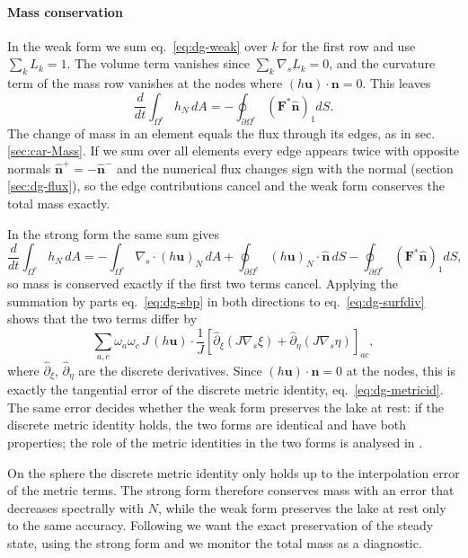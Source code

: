 \paragraph{Mass conservation}
In the weak form we sum eq.~\eqref{eq:dg-weak} over $k$ for the first row and use $\sum_k L_k = 1$. The volume term vanishes since $\sum_k\nabla_s L_k = 0$, and the curvature term of the mass row vanishes at the nodes where $(h\mathbf{u})\cdot\mathbf{n} = 0$. This leaves
\begin{equation*}
    \frac{d}{dt}\int_{\Omega^e}h_N\,dA = -\oint_{\partial\Omega^e}\left(\mathbf{F}^*\hat{\mathbf{n}}\right)_1 dS .
\end{equation*}
The change of mass in an element equals the flux through its edges, as in sec. \ref{sec:car-Mass}. If we sum over all elements every edge appears twice with opposite normals $\hat{\mathbf{n}}^+ = -\hat{\mathbf{n}}^-$ and the numerical flux changes sign with the normal (section \ref{sec:dg-flux}), so the edge contributions cancel and the weak form conserves the total mass exactly.

In the strong form the same sum gives
\begin{equation*}
    \frac{d}{dt}\int_{\Omega^e}h_N\,dA = -\int_{\Omega^e}\nabla_s\cdot(h\mathbf{u})_N\,dA + \oint_{\partial\Omega^e}(h\mathbf{u})_N\cdot\hat{\mathbf{n}}\,dS - \oint_{\partial\Omega^e}\left(\mathbf{F}^*\hat{\mathbf{n}}\right)_1 dS,
\end{equation*}
so mass is conserved exactly if the first two terms cancel. Applying the summation by parts eq.~\eqref{eq:dg-sbp} in both directions to eq.~\eqref{eq:dg-surfdiv} shows that the two terms differ by
\begin{equation*}
    \sum_{a,c}\omega_a\omega_c\,J\,(h\mathbf{u})\cdot\frac{1}{J}\left[\hat\partial_\xi\left(J\nabla_s\xi\right) + \hat\partial_\eta\left(J\nabla_s\eta\right)\right]_{ac},
\end{equation*}
where $\hat\partial_\xi$, $\hat\partial_\eta$ are the discrete derivatives. Since $(h\mathbf{u})\cdot\mathbf{n} = 0$ at the nodes, this is exactly the tangential error of the discrete metric identity, eq.~\eqref{eq:dg-metricid}. The same error decides whether the weak form preserves the lake at rest: if the discrete metric identity holds, the two forms are identical and have both properties; the role of the metric identities in the two forms is analysed in \cite{kopriva2006metric}. 

On the sphere the discrete metric identity only holds up to the interpolation error of the metric terms. The strong form therefore conserves mass with an error that decreases spectrally with $N$, while the weak form preserves the lake at rest only to the same accuracy. Following \cite{bonev2018discontinuous} we want the exact preservation of the steady state, using the strong form and we monitor the total mass as a diagnostic.

